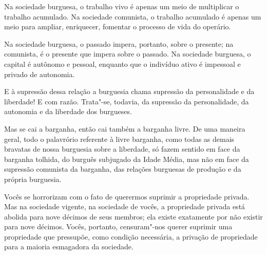 
Na sociedade burguesa, o trabalho vivo é apenas um meio de multiplicar o
trabalho acumulado. Na sociedade comunista, o trabalho acumulado é
apenas um meio para ampliar, enriquecer, fomentar o processo de vida do
operário.

Na sociedade burguesa, o passado impera, portanto, sobre o presente; na
comunista, é o presente que impera sobre o passado. Na sociedade
burguesa, o capital é autônomo e pessoal, enquanto que o indivíduo ativo
é impessoal e privado de autonomia.

E à supressão dessa relação a burguesia chama supressão da personalidade
e da liberdade! E com razão. Trata"-se, todavia, da supressão da
personalidade, da autonomia e da liberdade dos burgueses.


Mas se cai a barganha, então cai também a barganha livre. De uma maneira
geral, todo o palavrório referente à livre barganha, como todas as
demais bravatas de nossa burguesia sobre a liberdade, só fazem sentido
em face da barganha tolhida, do burguês subjugado da Idade Média, mas
não em face da supressão comunista da barganha, das relações burguesas
de produção e da própria burguesia.

Vocês se horrorizam com o fato de querermos suprimir a propriedade
privada. Mas na sociedade vigente, na sociedade de vocês, a propriedade
privada está abolida para nove décimos de seus membros; ela existe
exatamente por não existir para nove décimos. Vocês, portanto,
censuram"-nos querer suprimir uma propriedade que pressupõe, como
condição necessária, a privação de propriedade para a maioria
esmagadora da sociedade.

